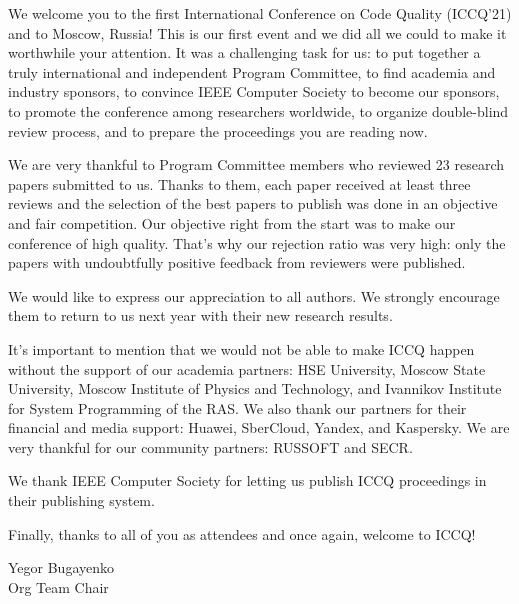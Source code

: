 \clearpage
{}

We welcome you to the first International Conference on Code Quality (ICCQ'21)
and to Moscow, Russia! This is our first event and we did all we could to make
it worthwhile your attention. It was a challenging task for us:
to put together a truly international and independent Program Committee,
to find academia and industry sponsors,
to convince IEEE Computer Society to become our sponsors,
to promote the conference among researchers worldwide,
to organize double-blind review process,
and to prepare the proceedings you are reading now.

We are very thankful to Program Committee members who
reviewed 23 research papers submitted to us. Thanks to them,
each paper received at least three reviews and the selection of the best papers to publish
was done in an objective and fair competition. Our objective right
from the start was to make our conference of high quality.
That's why our rejection ratio was very high: only the
papers with undoubtfully positive feedback from reviewers were published.

We would like to express our appreciation to all authors.
We strongly encourage them to return to us next year
with their new research results.

It's important to mention that we would not be able to make
ICCQ happen without the support of our academia partners:
HSE University,
Moscow State University,
Moscow Institute of Physics and Technology,
and Ivannikov Institute for System Programming of the RAS.
We also thank our partners for their financial and media support:
Huawei, SberCloud, Yandex, and Kaspersky.
We are very thankful for our community partners: RUSSOFT and SECR.

We thank IEEE Computer Society for letting us publish ICCQ proceedings
in their publishing system.

Finally, thanks to all of you as attendees and once again, welcome to ICCQ!

Yegor Bugayenko\\
Org Team Chair
